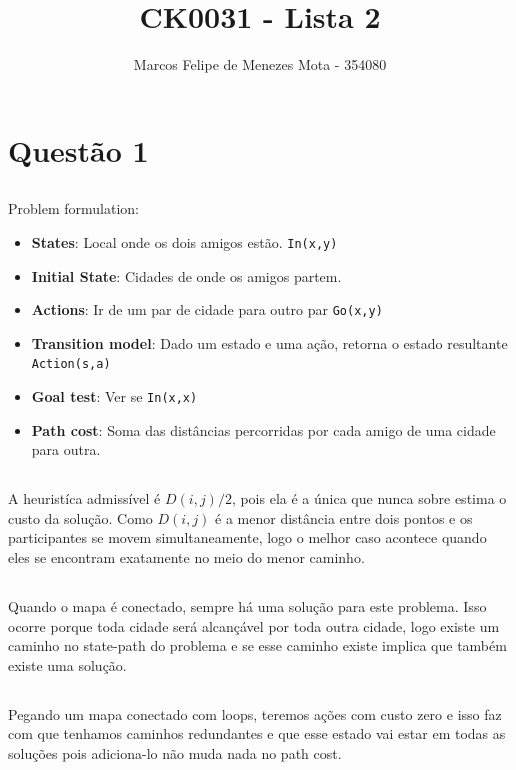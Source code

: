 \documentclass[a4paper,12pt]{article}
\author{Marcos Felipe de Menezes Mota - 354080}
\title{CK0031 - Lista 2}
\date{}
\begin{document}
\maketitle
\section{Questão 1}
\subsection{}
Problem formulation:\\
\begin{itemize}
\item \textbf{States}: Local onde os dois amigos estão. \texttt{In(x,y)}
\item \textbf{Initial State}: Cidades de onde os amigos partem.
\item \textbf{Actions}: Ir de um par de cidade para outro par \texttt{Go(x,y)}
\item \textbf{Transition model}: Dado um estado e uma ação, retorna o estado resultante \texttt{Action(s,a)}
\item \textbf{Goal test}: Ver se \texttt{In(x,x)}
\item \textbf{Path cost}: Soma das distâncias percorridas por cada amigo de uma cidade para outra.   
\end{itemize}

\subsection{}
A heuristíca admissível é $D(i,j)/2$, pois ela é a única que nunca sobre estima o custo da solução. Como $D(i,j)$ é a menor distância entre dois pontos e os participantes se movem simultaneamente, logo o melhor caso acontece quando eles se encontram exatamente no meio do menor caminho.

\subsection{}
Quando o mapa é conectado, sempre há uma solução para este problema. Isso ocorre porque toda cidade será alcançável por toda outra cidade, logo existe um caminho no state-path do problema e se esse caminho existe implica que também existe uma solução.

\subsection{}
Pegando um mapa conectado com loops, teremos ações com custo zero e isso faz com que tenhamos caminhos redundantes e que esse estado vai estar em todas as soluções pois adiciona-lo não muda nada no path cost.  
\end{document}
